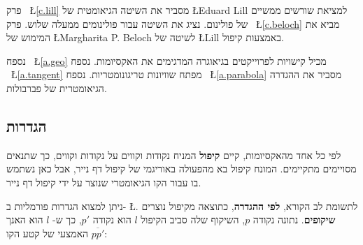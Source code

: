 פרק%
~\L{\ref{c.lill}}
מסביר את השיטה הגיאומטית של 
\L{Eduard Lill}
למציאת שורשים ממשיים של פולינום. נציג את השיטה עבור פולינומים ממעלה שלוש. פרק%
~\L{\ref{c.beloch}}
מביא את המימוש של
\L{Margharita P. Beloch}
לשיטה של 
\L{Lill}
באמצעות קיפול.

נספח%
~\L{\ref{a.geo}}
מכיל קישויות לפרוייקטים בגיאוגרה המדגימים את האקסיומות. נספח%
~\L{\ref{a.tangent}}
מפתח שוויונות טריגונומטריות. נספח%
~\L{\ref{a.parabola}}
מסביר את ההגדרה הגיאומטרית של פברבולות.

\subsection*{הגדרות}

לפי כל אחד מהאקסיומות, קיים
\textbf{קיפול}
המניח נקודות וקווים על נקודות וקווים, כך שתנאים מסויימים מתקיימים. המונח קיפול בא מהפעולה באוריגמי של קיפול דף נייר, אבל כאן נשתמש בו עבור הקו הגיאומטרי שנוצר על ידי קיפול דף נייר.

ניתן למצוא הגדרות פורמליות ב-%
\L{\cite[10~]{martin}}.
לתשומת לב הקורא, 
\textbf{לפי ההגדרה},
כתוצאה מקיפול נוצרים 
\textbf{שיקופים}.
נתונה נקודה 
$p$,
השיקוף שלה סביב הקיפול 
$l$
הוא נקודה
$p'$,
כך ש-%
$l$
הוא האנך האמצעי של קטע הקו
$\overline{pp'}$:

\begin{center}
\end{center}
